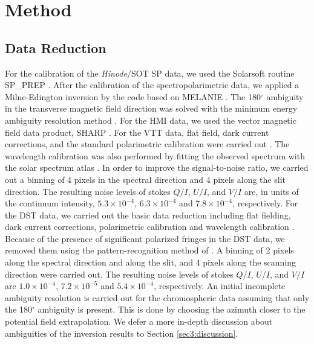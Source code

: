 \documentclass[manuscript]{aastex61}
\begin{document}

\section{Method}
 

 \subsection{Data Reduction}
 
For the calibration of the {\it Hinode}/SOT SP data, we used the Solarsoft routine SP\_PREP  \citep{2013SoPh..283..601L}.
After the calibration of the spectropolarimetric data, we applied a Milne-Edington inversion by the code based on MELANIE \citep{2001ASPC..236..487S}.
The 180$^\circ$ ambiguity in the transverse magnetic field direction was solved
with the minimum energy ambiguity resolution method
\citep{1994SoPh..155..235M,2009ASPC..415..365L}. For the HMI data, we used the
vector magnetic field data product, SHARP \citep{2014SoPh..289.3549B}. For the
VTT data, flat field, dark current corrections, and the standard polarimetric
calibration were carried out \citep{1999AGAb...15Q..11C,2003SPIE.4843...55C}.
The wavelength calibration was also performed by fitting the observed spectrum with
the solar spectrum atlas \citep{1981atlasinfra}. In order to improve the
signal-to-noise ratio, we carried out a binning of 4 pixels in the spectral direction
and 4 pixels along the slit direction. The resulting noise levels of stokes $Q/I$, $U/I$,
and $V/I$ are, in units of the continuum intensity, $5.3\times 10^{-4}$, $6.3\times10^{-4}$ and $7.8\times 10^{-4}$,
respectively. For the DST data, we carried out the basic data reduction
including flat fielding, dark current corrections, polarimetric calibration and wavelength
calibration \citep{2005A&A...437.1159B}. 
Because of the presence of significant polarized fringes in the DST data, we
removed them using the pattern-recognition method of \cite{2012ApJ...756..194C}. 
A binning of 2 pixels along the spectral direction
and along the slit, and 4 pixels along the scanning direction were
carried out. The resulting noise levels of stokes $Q/I$, $U/I$, and $V/I$ are
$1.0\times 10^{-4}$, $7.2\times10^{-5}$ and $5.4\times 10^{-4}$, respectively.
An initial incomplete ambiguity resolution is carried out for the
chromospheric data assuming that only the 180$^\circ$ ambiguity is
present. This is done by choosing the azimuth closer to the potential field extrapolation.
We defer a more in-depth discussion about ambiguities of the inversion results to Section
\ref{sec3:discussion}.
\end{document}
